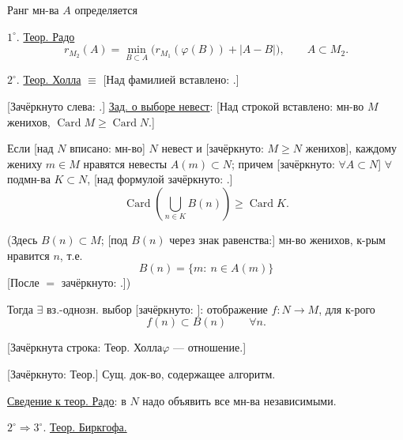 Ранг мн-ва $A$ определяется

$1^{\circ}$. \underline{Теор. Радо}
\begin{equation*}
r_{M_2}(A)=\min_{B\subset A}
\bigl(r_{M_1}(\varphi(B))+|A-B|\bigr),\qquad A\subset M_2.
\end{equation*}

$2^{\circ}$. \underline{Теор. Холла} $\equiv$
[Над фамилией вставлено: .]

[Зачёркнуто слева: .]
\underline{Зад. о выборе невест}:
[Над строкой вставлено: мн-во $M$ женихов,
$\operatorname{Card}M\geq\operatorname{Card}N$.]

Если [над $N$ вписано: мн-во] $N$ невест и
[зачёркнуто: $M\geq N$ женихов], каждому жениху $m\in M$
нравятся невесты $A(m)\subset N$; причем
[зачёркнуто: $\forall A\subset N$] $\forall$ подмн-ва
$K\subset N$,
[над формулой зачёркнуто: .]
\begin{equation*}
\operatorname{Card}\left(\bigcup_{n\in K}B(n)\right)
\geq \operatorname{Card}K.
\end{equation*}



(Здесь $B(n)\subset M$;
[под $B(n)$ через знак равенства:]
мн-во женихов, к-рым нравится $n$, т.е.
\begin{equation*}
B(n)=
\{m:\ n\in A(m)\}
\end{equation*}
[После $=$ зачёркнуто: .])

Тогда $\exists$ вз.-однозн. выбор
[зачёркнуто: ]:
отображение $f:N\longrightarrow M$, для к-рого
\begin{equation*}
f(n)\subset B(n)\qquad \forall n.
\end{equation*}

[Зачёркнута строка: Теор. Холла\quad $\varphi$ — отношение.]

[Зачёркнуто: Теор.]
Сущ. док-во, содержащее алгоритм.

\underline{Сведение к теор. Радо}: в $N$ надо объявить все мн-ва независимыми.

$2^{\circ}\Rightarrow 3^{\circ}$. \underline{Теор. Биркгофа.}

